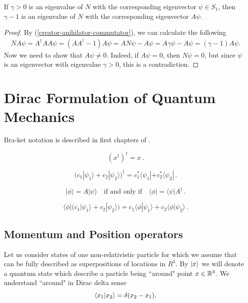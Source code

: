 \documentclass[main.tex]{subfiles}
\begin{document}
\begin{fact}
If $\gamma > 0$ is an eigenvalue of $N$ with the corresponding eigenvector $\psi\in S_1$, then $\gamma - 1$ is an eigenvalue of $N$ with the corresponding eigenvector $A\psi$.
\end{fact}
\begin{proof}
By (\ref{creator-anihilator-commutator}), we can calculate the following
\begin{multline}
N A\psi = A^\dag A A \psi = (AA^\dag - 1)A\psi = AN\psi - A\psi = A\gamma\psi - A\psi = (\gamma - 1)A\psi.
\end{multline}
Now we need to show that $A\psi \not= 0$. Indeed, if $A\psi=0$, then $N\psi = 0$, but since $\psi$ is an eigenvector with eigenvalue $\gamma > 0$, this is a contradiction.
\end{proof}
\section{Dirac Formulation of Quantum Mechanics}

Bra-ket notation is described in first chapters of \cite{dirac1981}.

\begin{equation}
\left(x^\dagger\right)^\dagger=x \,.
\end{equation}

\begin{equation}
\bigl(c_1|\psi_1\rangle + c_2|\psi_2\rangle\bigr)^\dagger = c_1^* \langle\psi_1| + c_2^* \langle\psi_2| \,.
\end{equation}

\begin{equation}
|\phi\rangle = A |\psi\rangle \quad \text{if and only if} \quad \langle\phi| = \langle \psi | A^\dagger \,.
\end{equation}

\begin{equation}
\langle\phi| \bigl( c_1|\psi_1\rangle + c_2|\psi_2\rangle \bigr) = c_1\langle\phi|\psi_1\rangle + c_2\langle\phi|\psi_2\rangle \,.
\end{equation}

\subsection{Momentum and Position operators}

Let us consider states of one non-relativistic particle for which we assume that can be fully described as superpositions of locations in $R^3$. By $\ket{x}$ we will denote a quantum state which describe a particle being ``around" point $x\in \mathbb{R}^3$. We understand ``around" in Dirac delta sense
\begin{equation}
\bra{x_1}\ket{x_2} = \delta(x_2 - x_1).
\end{equation}
\end{document}
